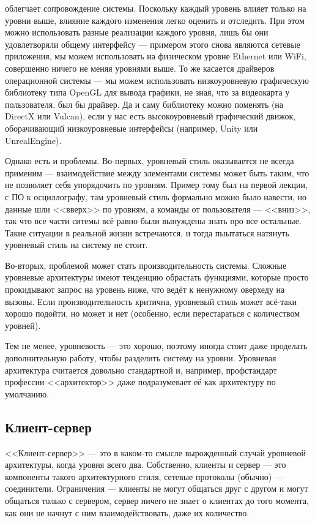 \documentclass[a5paper]{article}
\begin{document}
 облегчает сопровождение системы. Поскольку каждый уровень влияет только на уровни выше, влияние каждого изменения легко оценить и отследить. При этом можно использовать разные реализации каждого уровня, лишь бы они удовлетворяли общему интерфейсу --- примером этого снова являются сетевые приложения, мы можем использовать на физическом уровне Ethernet или WiFi, совершенно ничего не меняя уровнями выше. То же касается драйверов операционной системы --- мы можем использовать низкоуровневую графическую библиотеку типа OpenGL для вывода графики, не зная, что за видеокарта у пользователя, был бы драйвер. Да и саму библиотеку можно поменять (на DirectX или Vulcan), если у нас есть высокоуровневый графический движок, оборачивающий низкоуровневые интерфейсы (например, Unity или UnrealEngine).

Однако есть и проблемы. Во-первых, уровневый стиль оказывается не всегда применим --- взаимодействие между элементами системы может быть таким, что не позволяет себя упорядочить по уровням. Пример тому был на первой лекции, с ПО к осциллографу, там уровневый стиль формально можно было навести, но данные шли <<вверх>> по уровням, а команды от пользователя --- <<вниз>>, так что все части ситемы всё равно были вынуждены знать про все остальные. Такие ситуации в реальной жизни встречаются, и тогда пыытаться натянуть уровневый стиль на систему не стоит. 

Во-вторых, проблемой может стать производительность системы. Сложные уровневые архитектуры имеют тенденцию обрастать функциями, которые просто прокидывают запрос на уровень ниже, что ведёт к ненужному оверхеду на вызовы. Если производительность критична, уровневый стиль может всё-таки хорошо подойти, но может и нет (особенно, если перестараться с количеством уровней). 

Тем не менее, уровневость --- это хорошо, поэтому иногда стоит даже проделать дополнительную работу, чтобы разделить систему на уровни. Уровневая архитектура считается довольно стандартной и, например, профстандарт профессии <<архитектор>> даже подразумевает её как архитектуру по умолчанию.

\subsection{Клиент-сервер}

<<Клиент-сервер>> --- это в каком-то смысле вырожденный случай уровневой архитектуры, когда уровня всего два. Собственно, клиенты и сервер --- это компоненты такого архитектурного стиля, сетевые протоколы (обычно) --- соединители. Ограничения --- клиенты не могут общаться друг с другом и могут общаться только с сервером, сервер ничего не знает о клиентах до того момента, как они не начнут с ним взаимодействовать, даже их количество. 
\end{document}
